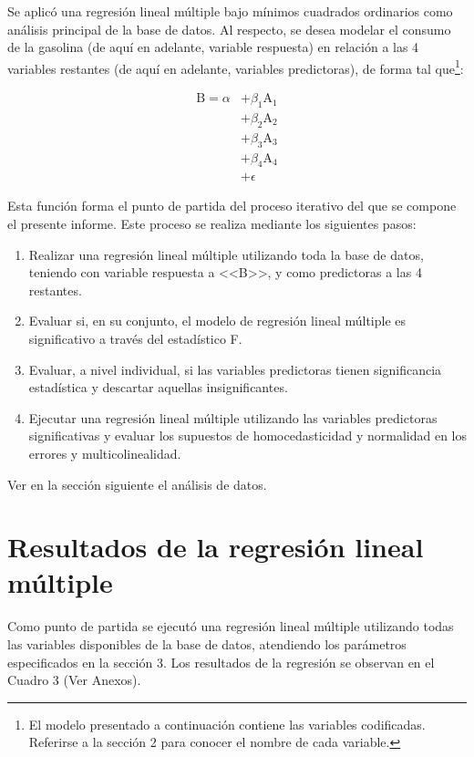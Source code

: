 \documentclass[a4paper,10pt]{article}\usepackage[]{graphicx}\usepackage[]{color}
\begin{document}
Se aplicó una regresión lineal múltiple bajo mínimos cuadrados ordinarios como análisis principal de la base de datos. Al respecto, se desea modelar el consumo de la gasolina (de aquí en adelante, variable respuesta) en relación a las 4 variables restantes (de aquí en adelante, variables predictoras), de forma tal que\footnote{El modelo presentado a continuación contiene las variables codificadas. Referirse a la sección 2 para conocer el nombre de cada variable.}:

\begin{align*}
\mathrm{B}= \alpha 
    &+ \beta_{1}  \mathrm{A}_{1} \\
    &+ \beta_{2}  \mathrm{A}_{2}    \\
    &+ \beta_{3}  \mathrm{A}_{3} \\
    &+ \beta_{4}  \mathrm{A}_{4} \\
    &+ \epsilon
\end{align*}

Esta función forma el punto de partida del proceso iterativo del que se compone el presente informe. Este proceso se realiza mediante los siguientes pasos:
\begin{enumerate}
  \item Realizar una regresión lineal múltiple utilizando toda la base de datos, teniendo con variable respuesta a <<B>>, y como predictoras a las 4 restantes.
  \item Evaluar si, en su conjunto, el modelo de regresión lineal múltiple es significativo a través del estadístico F.
  \item Evaluar, a nivel individual, si las variables predictoras tienen significancia estadística y descartar aquellas insignificantes.
  \item Ejecutar una regresión lineal múltiple utilizando las variables predictoras significativas y evaluar los supuestos de homocedasticidad y normalidad en los errores y multicolinealidad.
\end{enumerate}

Ver en la sección siguiente el análisis de datos.

\section{Resultados de la regresión lineal múltiple}

Como punto de partida se ejecutó una regresión lineal múltiple utilizando todas las variables disponibles de la base de datos, atendiendo los parámetros especificados en la sección 3. Los resultados de la regresión se observan en el Cuadro 3 (Ver Anexos).
\end{document}
